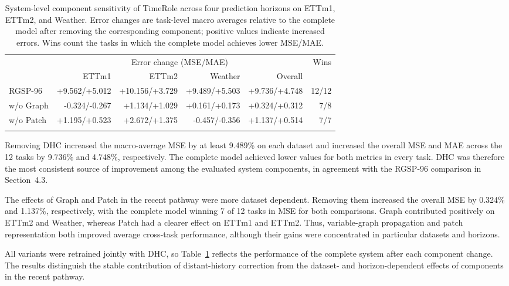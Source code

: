\begin{table}[t]
\tablecaptionfont
\caption{System-level component sensitivity of TimeRole across four prediction horizons on ETTm1, ETTm2, and Weather. Error changes are task-level macro averages relative to the complete model after removing the corresponding component; positive values indicate increased errors. Wins count the tasks in which the complete model achieves lower MSE/MAE.}
\label{tab:core-component-sensitivity}
\centering
\tablebodyfont
\setlength{\tabcolsep}{4pt}
\renewcommand{\arraystretch}{1.08}
\begin{tabular*}{\textwidth}{@{\extracolsep{\fill}}lrrrrr@{}}
\toprule\noalign{}
\multirow{2}{*}{Variant} & \multicolumn{4}{c}{Error change (MSE/MAE)} & \multirow{2}{*}{Wins} \\
\cmidrule(lr){2-5}
& ETTm1 & ETTm2 & Weather & Overall & \\
\midrule\noalign{}
RGSP-96 & +9.562/+5.012 & +10.156/+3.729 & +9.489/+5.503 & +9.736/+4.748 & 12/12 \\
w/o Graph & -0.324/-0.267 & +1.134/+1.029 & +0.161/+0.173 & +0.324/+0.312 & 7/8 \\
w/o Patch & +1.195/+0.523 & +2.672/+1.375 & -0.457/-0.356 & +1.137/+0.514 & 7/7 \\
\bottomrule\noalign{}
\end{tabular*}
\end{table}

Removing DHC increased the macro-average MSE by at least 9.489\% on each dataset and increased the overall MSE and MAE across the 12 tasks by 9.736\% and 4.748\%, respectively. The complete model achieved lower values for both metrics in every task. DHC was therefore the most consistent source of improvement among the evaluated system components, in agreement with the RGSP-96 comparison in Section~4.3.

The effects of Graph and Patch in the recent pathway were more dataset dependent. Removing them increased the overall MSE by 0.324\% and 1.137\%, respectively, with the complete model winning 7 of 12 tasks in MSE for both comparisons. Graph contributed positively on ETTm2 and Weather, whereas Patch had a clearer effect on ETTm1 and ETTm2. Thus, variable-graph propagation and patch representation both improved average cross-task performance, although their gains were concentrated in particular datasets and horizons.

All variants were retrained jointly with DHC, so Table~\ref{tab:core-component-sensitivity} reflects the performance of the complete system after each component change. The results distinguish the stable contribution of distant-history correction from the dataset- and horizon-dependent effects of components in the recent pathway.

